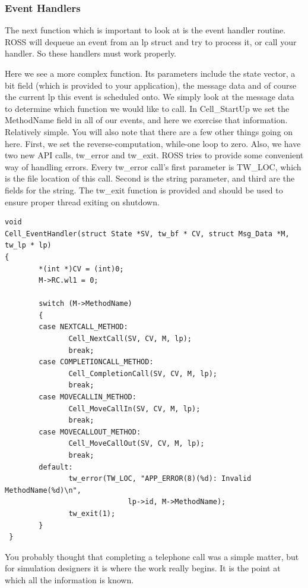 \documentclass[12pt]{article}
\begin{document}
 
\subsubsection{Event Handlers}
The next function which is important to look at is the event handler
routine.  ROSS will dequeue an event from an lp struct and try to
process it, or call your handler.  So these handlers must work
properly.

Here we see a more complex function.  Its parameters include the state vector,
a bit field (which is provided to your application), the message data and of
course the current lp this event is scheduled onto.  We simply look at the
message data to determine which function we would like to call.  In
Cell\_StartUp we set the MethodName field in all of our events, and here we
exercise that information.  Relatively simple.  You will also note that there
are a few other things going on here.  First, we set the reverse-computation,
while-one loop to zero.  Also, we have two new API calls, tw\_error and
tw\_exit.  ROSS tries to provide some convenient way of handling errors.
Every tw\_error call's first parameter is TW\_LOC, which is the file location
of this call.  Second is the string parameter, and third are the fields for
the string.  The tw\_exit function is provided and should be used to ensure
proper thread exiting on shutdown.

\begin{verbatim}
void
Cell_EventHandler(struct State *SV, tw_bf * CV, struct Msg_Data *M, tw_lp * lp)
{
        *(int *)CV = (int)0;
        M->RC.wl1 = 0;

        switch (M->MethodName)
        {
        case NEXTCALL_METHOD:
               Cell_NextCall(SV, CV, M, lp);
               break;
        case COMPLETIONCALL_METHOD:
               Cell_CompletionCall(SV, CV, M, lp);
               break;
        case MOVECALLIN_METHOD:
               Cell_MoveCallIn(SV, CV, M, lp);
               break;
        case MOVECALLOUT_METHOD:
               Cell_MoveCallOut(SV, CV, M, lp);
               break;
        default:
               tw_error(TW_LOC, "APP_ERROR(8)(%d): Invalid MethodName(%d)\n",
                             lp->id, M->MethodName);
               tw_exit(1);
        }
 }
\end{verbatim}
 
You probably thought that completing a telephone call was a simple
matter, but for simulation designers it is where the work really
begins.  It is the point at which all the information is known.
\end{document}
